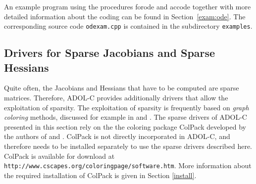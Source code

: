 \documentclass[11pt,twoside]{article}
\begin{document}
An example program using the procedures {\sf forode} and {\sf accode} together
with more detailed information about the coding can be found in
Section~\ref{exam:ode}. The corresponding source code 
\verb=odexam.cpp= is contained in the subdirectory
\verb=examples=.
%
%
\subsection{Drivers for Sparse Jacobians and Sparse Hessians}
\label{sparse}
%
Quite often, the Jacobians and Hessians that have to be computed are sparse
matrices. Therefore, ADOL-C provides additionally drivers that 
allow the exploitation of sparsity. The exploitation of sparsity is
frequently based on {\em graph coloring} methods, discussed 
for example in \cite{GeMaPo05} and \cite{GeTaMaPo07}. The sparse drivers of ADOL-C presented in this section
rely on the the coloring package ColPack developed by the authors of \cite{GeMaPo05} and \cite{GeTaMaPo07}.
ColPack is not directly incorporated in ADOL-C, and therefore needs to be installed
separately to use the sparse drivers described here. ColPack is available for download at
\verb=http://www.cscapes.org/coloringpage/software.htm=. More information about the required
installation of ColPack is given in Section \ref{install}.
%
\end{document}
